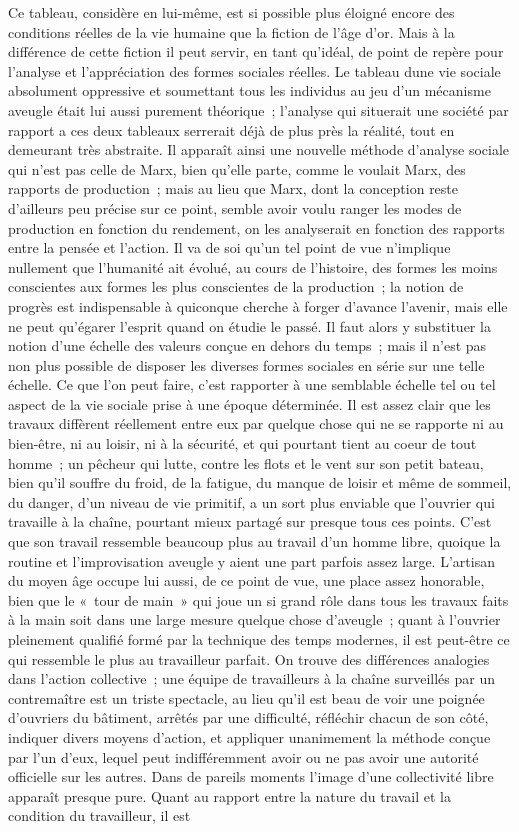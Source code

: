 \documentclass[french,twoside]{book} %
\begin{document}
Ce tableau, considère en lui-même, est si possible plus éloigné encore des conditions réelles de la vie humaine que la fiction de l'âge d'or. Mais à la différence de cette fiction il peut servir, en tant qu'idéal, de point de repère pour l'analyse et l'appréciation des formes sociales réelles. Le tableau dune vie sociale absolument oppressive et soumettant tous les individus au jeu d'un mécanisme aveugle était lui aussi purement théorique ; l'analyse qui situerait une société par rapport a ces deux tableaux serrerait déjà de plus près la réalité, tout en demeurant très abstraite. Il apparaît ainsi une nouvelle méthode d'analyse sociale qui n'est pas celle de Marx, bien qu'elle parte, comme le voulait Marx, des rapports de production ; mais au lieu que Marx, dont la conception reste d'ailleurs peu précise sur ce point, semble avoir voulu ranger les modes de production en fonction du rendement, on les analyserait en fonction des rapports entre la pensée et l'action. Il va de soi qu'un tel point de vue n'implique nullement que l'humanité ait évolué, au cours de l'histoire, des formes les moins conscientes aux formes les plus conscientes de la production ; la notion de progrès est indispensable à quiconque cherche à forger d'avance l'avenir, mais elle ne peut qu'égarer l'esprit quand on étudie le passé. Il faut alors y substituer la notion d'une échelle des valeurs conçue en dehors du temps ; mais il n'est pas non plus possible de disposer les diverses formes sociales en série sur une telle échelle. Ce que l'on peut faire, c'est rapporter à une semblable échelle tel ou tel aspect de la vie sociale prise à une époque déterminée. Il est assez clair que les travaux diffèrent réellement entre eux par quelque chose qui ne se rapporte ni au bien-être, ni au loisir, ni à la sécurité, et qui pourtant tient au coeur de tout homme ; un pêcheur qui lutte, contre les flots et le vent sur son petit bateau, bien qu'il souffre du froid, de la fatigue, du manque de loisir et même de sommeil, du danger, d'un niveau de vie primitif, a un sort plus enviable que l'ouvrier qui travaille à la chaîne, pourtant mieux partagé sur presque tous ces points. C'est que son travail ressemble beaucoup plus au travail d'un homme libre, quoique la routine et l'improvisation aveugle y aient une part parfois assez large. L'artisan du moyen âge occupe lui aussi, de ce point de vue, une place assez honorable, bien que le « tour de main » qui joue un si grand rôle dans tous les travaux faits à la main soit dans une large mesure quelque chose d'aveugle ; quant à l'ouvrier pleinement qualifié formé par la technique des temps modernes, il est peut-être ce qui ressemble le plus au travailleur parfait. On trouve des différences analogies dans l'action collective ; une équipe de travailleurs à la chaîne surveillés par un contremaître est un triste spectacle, au lieu qu'il est beau de voir une poignée d'ouvriers du bâtiment, arrêtés par une difficulté, réfléchir chacun de son côté, indiquer divers moyens d'action, et appliquer unanimement la méthode conçue par l'un d'eux, lequel peut indifféremment avoir ou ne pas avoir une autorité officielle sur les autres. Dans de pareils moments l'image d'une collectivité libre apparaît presque pure. Quant au rapport entre la nature du travail et la condition du travailleur, il est 
\end{document}
